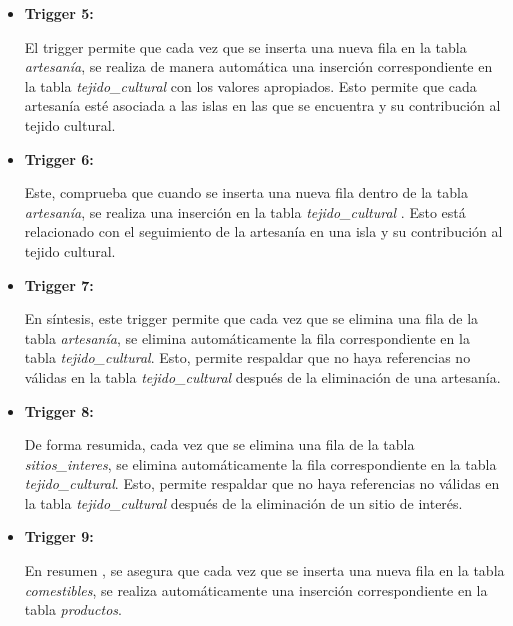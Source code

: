 \documentclass[11pt]{report}
\begin{document}
\begin{itemize}
      \item \textbf{Trigger 5:}
            \lstset{style=mystyle}
            

            El trigger permite que cada vez que se inserta una nueva fila en la tabla \emph{artesanía}, se realiza de manera automática una inserción correspondiente en la tabla \emph{tejido\_cultural} con los valores apropiados. Esto permite que cada artesanía esté asociada a las islas en las que se encuentra y su contribución al tejido cultural.

      \item \textbf{Trigger 6:}
            \lstset{style=mystyle}
            

            Este, comprueba que cuando se inserta una nueva fila dentro de la tabla \emph{artesanía}, se realiza una inserción en la tabla \emph{tejido\_cultural} . Esto está relacionado con el seguimiento de la artesanía en una isla y su contribución al tejido cultural.

      \item \textbf{Trigger 7:}
            \lstset{style=mystyle}
            

            En síntesis, este trigger permite que cada vez que se elimina una fila de la tabla \emph{artesanía}, se elimina automáticamente la fila correspondiente en la tabla \emph{tejido\_cultural}. Esto, permite respaldar que no haya referencias no válidas en la tabla \emph{tejido\_cultural} después de la eliminación de una artesanía.

      \item \textbf{Trigger 8:}
            \lstset{style=mystyle}
            

            De forma resumida, cada vez que se elimina una fila de la tabla \emph{sitios\_interes}, se elimina automáticamente la fila correspondiente en la tabla \emph{tejido\_cultural}. Esto, permite respaldar que no haya referencias no válidas en la tabla \emph{tejido\_cultural} después de la eliminación de un sitio de interés.

      \item \textbf{Trigger 9:}
            \lstset{style=mystyle}
            

            En resumen , se asegura que cada vez que se inserta una nueva fila en la tabla \emph{comestibles}, se realiza automáticamente una inserción correspondiente en la tabla \emph{productos}.


\end{itemize}
\end{document}
